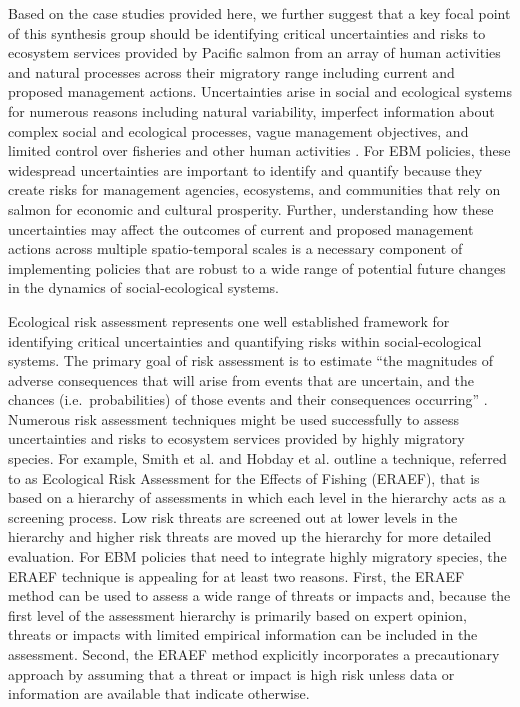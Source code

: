 Based on the case studies provided here, we further suggest that a key focal
point of this synthesis group should be identifying critical uncertainties and
risks to ecosystem services provided by Pacific salmon from an array of human
activities and natural processes across their migratory range including current
and proposed management actions. Uncertainties arise in social and ecological
systems for numerous reasons including natural variability, imperfect
information about complex social and ecological processes, vague management
objectives, and limited control over fisheries and other human activities
\citep{Peterman2004a}. For EBM policies, these widespread uncertainties are
important to identify and quantify because they create risks for management
agencies, ecosystems, and communities that rely on salmon for economic and
cultural prosperity. Further, understanding how these uncertainties may affect
the outcomes of current and proposed management actions across multiple
spatio-temporal scales is a necessary component of implementing policies that
are robust to a wide range of potential future changes in the dynamics of
social-ecological systems.

Ecological risk assessment represents one well established framework for
identifying critical uncertainties and quantifying risks within
social-ecological systems. The primary goal of risk assessment is to estimate
``the magnitudes of adverse consequences that will arise from events that are
uncertain, and the chances (i.e.~probabilities) of those events and their
consequences occurring'' \citep{Peterman2004a}. Numerous risk assessment
techniques might be used successfully to assess uncertainties and risks to
ecosystem services provided by highly migratory species. For example, Smith et
al. \citet{Smith2007} and Hobday et al. \citet{Hobday2011} outline a technique,
referred to as Ecological Risk Assessment for the Effects of Fishing (ERAEF),
that is based on a hierarchy of assessments in which each level in the hierarchy
acts as a screening process. Low risk threats are screened out at lower levels
in the hierarchy and higher risk threats are moved up the hierarchy for more
detailed evaluation. For EBM policies that need to integrate highly migratory
species, the ERAEF technique is appealing for at least two reasons. First, the
ERAEF method can be used to assess a wide range of threats or impacts and,
because the first level of the assessment hierarchy is primarily based on expert
opinion, threats or impacts with limited empirical information can be included
in the assessment. Second, the ERAEF method explicitly incorporates a
precautionary approach by assuming that a threat or impact is high risk unless
data or information are available that indicate otherwise.

